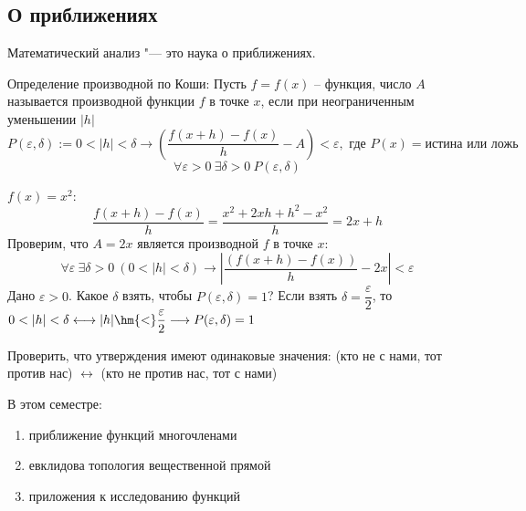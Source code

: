 
\subsection{О приближениях}

    Математический анализ "--- это наука о приближениях.

    \begin{definition}
        Определение производной по Коши:
        Пусть $f = f(x)$ -- функция, число $A$ называется производной функции $f$ в
        точке $x$, если при неограниченным уменьшении $|h|$ \[
        P(\varepsilon, \delta) :=   0 < |h| < \delta \longrightarrow \left(\frac{f(x + h) - f(x)}{h} - A\right) < \varepsilon,
        \text{ где } P(x) = \text{истина или ложь} \]
        \[\forall \varepsilon > 0 \
        \exists \delta > 0 \ P(\varepsilon, \delta)
        \]
    \end{definition}
    \begin{example}
        $f(x) = x^2$:
        \begin{equation*}
            \frac{f(x + h) - f(x)}{h} = \frac{x^2 + 2xh + h^2 - x^2}{h} = 2x + h 
        \end{equation*}
        Проверим, что $A  = 2x$ является производной $f$ в точке $x$:
        \begin{equation*}
            \forall \varepsilon \ \exists \delta > 0 \ (0 < |h| < \delta) \rightarrow \left|\frac{(f(x + h )
            - f(x))}{h} - 2x\right| < \varepsilon
        \end{equation*}
        Дано $\varepsilon > 0$. Какое $\delta$ взять, чтобы $P(\varepsilon, \delta) = 1$?
        Если взять $\delta = \dfrac{\varepsilon}{2}$, то $0 < |h| < \delta \longleftrightarrow  |h|\hm{<} \dfrac{\varepsilon}{2}
        \longrightarrow P(\varepsilon, \delta) = 1$
    \end{example}
    \begin{exercise}
        Проверить, что утверждения имеют одинаковые значения: (кто не с нами, тот 
        против нас) $\longleftrightarrow$ (кто не против нас, тот с нами)
    \end{exercise}
    В этом семестре:
    \begin{enumerate}
        \item приближение функций многочленами
        \item евклидова топология вещественной прямой
        \item приложения к исследованию функций
    \end{enumerate}
